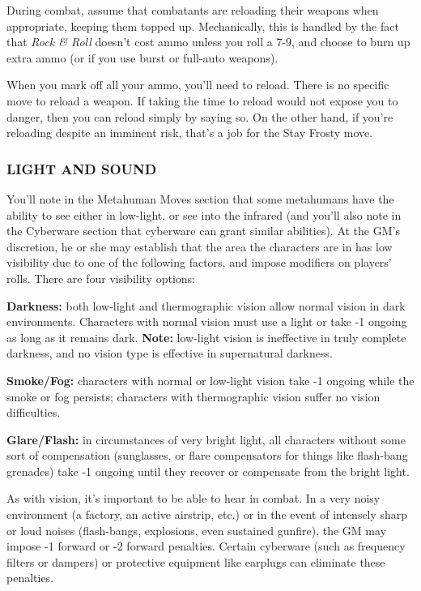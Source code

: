 \documentclass[oneside,10pt]{article}
\begin{document}
\begin{multicols}{2}
During combat, assume that combatants are reloading their weapons when
appropriate, keeping them topped up. Mechanically, this is handled by
the fact that \textit{Rock \& Roll} doesn’t cost ammo unless you roll
a 7-9, and choose to burn up extra ammo (or if you use burst or
full-auto weapons).

When you mark off all your ammo, you’ll need to reload.
There is no specific move to reload a weapon. If taking the
time to reload would not expose you to danger, then you
can reload simply by saying so. On the other hand, if you’re
reloading despite an imminent risk, that’s a job for the Stay
Frosty move.

\subsubsection{LIGHT AND SOUND}
You’ll note in the Metahuman Moves section that some metahumans have
the ability to see either in low-light, or see into the infrared (and
you’ll also note in the Cyberware section that cyberware can grant
similar abilities). At the GM’s discretion, he or she may establish
that the area the characters are in has low visibility due to one of
the following factors, and impose modifiers on players’ rolls. There
are four visibility options:
\begin{dent}

  \textbf{Darkness:} both low-light and thermographic vision allow
  normal vision in dark environments. Characters with normal vision
  must use a light or take -1 ongoing as long as it remains
  dark. \textbf{Note:} low-light vision is ineffective in truly
  complete darkness, and no vision type is effective in supernatural
  darkness.

  \textbf{Smoke/Fog:} characters with normal or low-light vision take
  -1 ongoing while the smoke or fog persists; characters with
  thermographic vision suffer no vision difficulties.

  \textbf{Glare/Flash:} in circumstances of very bright light, all
  characters without some sort of compensation (sunglasses, or flare
  compensators for things like flash-bang grenades) take -1 ongoing
  until they recover or compensate from the bright light.
\end{dent}

As with vision, it’s important to be able to hear in combat.
In a very noisy environment (a factory, an active airstrip, etc.)
or in the event of intensely sharp or loud noises (flash-bangs,
explosions, even sustained gunfire), the GM may impose -1
forward or -2 forward penalties. Certain cyberware (such as
frequency filters or dampers) or protective equipment like
earplugs can eliminate these penalties.


\end{multicols}
\end{document}
